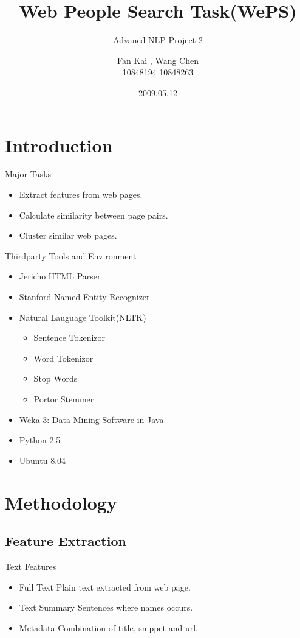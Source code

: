 \documentclass{beamer}
\title{Web People Search Task(WePS)}
\subtitle{Advaned NLP Project 2}
\author[Fan Kai , Wang Chen]{Fan Kai , Wang Chen \\ 10848194 10848263}
\institute{Peking University}
\date{2009.\alert{05.12}}
\begin{document}
\begin{frame}[label=titlepage]
    \titlepage
\end{frame}

\section{Introduction}
\begin{frame}{Major Tasks}
    \begin{itemize}
    \item Extract features from web pages.
    \item Calculate similarity between page pairs.
    \item Cluster similar web pages.
    \end{itemize}
\end{frame}

\begin{frame}{Thirdparty Tools and Environment}
    \begin{itemize}
    \item Jericho HTML Parser
    \item Stanford Named Entity Recognizer
    \item Natural Lauguage Toolkit(NLTK)
        \begin{itemize}
        \item Sentence Tokenizor
        \item Word Tokenizor
        \item Stop Words
        \item Portor Stemmer
        \end{itemize}
    \item Weka 3: Data Mining Software in Java
    \item Python 2.5
    \item Ubuntu 8.04
    \end{itemize}
\end{frame}
    
\section{Methodology}
\subsection{Feature Extraction}
\begin{frame}{Text Features}
    \begin{itemize}
    \item Full Text 
        Plain text extracted from web page.
    \item Text Summary 
        Sentences where names occurs.
    \item Metadata 
        Combination of title, snippet and url.
    \end{itemize}
\end{frame}
\end{document}
